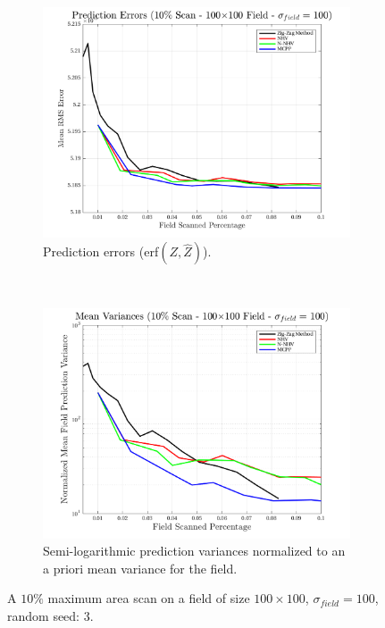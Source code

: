 \begin{figure}[htb!]
    \centering
    \begin{subfigure}[t]{0.65\textwidth}
        \centering
        \includegraphics[width=\linewidth]{figures/hbresults/pred_errs_10p_100x100_sf_100_seed_3.png}
        \captionsetup{skip=0.20\baselineskip,size=footnotesize}
        \caption{Prediction errors (erf$(Z,\hat{Z})$).}
        \label{fig:prederrs_sigma100_p10_s3}
    \end{subfigure}%
    \\
    \begin{subfigure}[t]{0.65\textwidth}
        \centering
        \includegraphics[width=\linewidth]{figures/hbresults/vars_10p_100x100_sf_100_seed_3.png}
        \captionsetup{skip=0.20\baselineskip,size=footnotesize}
        \caption{Semi-logarithmic prediction variances normalized to an a priori mean variance for the field.}
        \label{fig:prederrs_sigma100_p10_s3}
    \end{subfigure}
    \captionsetup{skip=0.20\baselineskip}
    \caption{A $10\%$ maximum area scan on a field of size $100 \times 100$, $\sigma_{field} = 100$, random seed: 3.}
    \label{fig:sigma100_p10_s3}
\end{figure}

